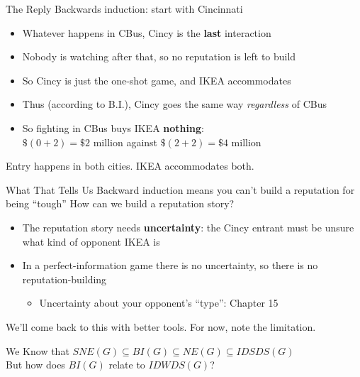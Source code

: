 \begin{frame}{The Reply}
Backwards induction: start with Cincinnati
\bsk
\begin{itemize}
    \item Whatever happens in CBus, Cincy is the \textbf{last} interaction
    \item Nobody is watching after that, so no reputation is left to build
    \item So Cincy is just the one-shot game, and IKEA accommodates \vspace{0.3in}
    \item Thus (according to B.I.), Cincy goes the same way \textit{regardless} of CBus
    \item So fighting in CBus buys IKEA \textbf{nothing}:\\$\$(0+2)=\$2$ million against
      $\$(2+2)=\$4$ million
\end{itemize}
\bsk
Entry happens in both cities. IKEA accommodates both.
\vspace{-0.3in}
\end{frame}

\begin{frame}{What That Tells Us}
Backward induction means you can't build a reputation for being ``tough''
\bsk
How can we build a reputation story?
\begin{itemize}
    \item The reputation story needs \textbf{uncertainty}: the Cincy entrant must be
      unsure what kind of opponent IKEA is
    \item In a perfect-information game there is no uncertainty, so there is no reputation-building
    \begin{itemize}
        \item Uncertainty about your opponent's ``type'': Chapter 15
    \end{itemize}
\end{itemize}
\vfill
We'll come back to this with better tools. For now, note the limitation.
\vspace{-0.4in}
\end{frame}

\begin{frame}[standout]
We Know that $SNE(G)\subseteq BI(G)\subseteq NE(G) \subseteq IDSDS(G)$\\
But how does $BI(G)$ relate to $IDWDS(G)$?
\end{frame}

